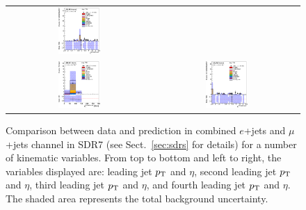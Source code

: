 \begin{figure}[htbp]
\begin{center}
\begin{tabular}{cc}
\includegraphics[width=0.30\textwidth]{appendices/figures/sdrs/JetEta3_ELEMUONCR7_1W_NOMINAL.eps} \\
\includegraphics[width=0.30\textwidth]{appendices/figures/sdrs/JetPt4_ELEMUONCR7_1W_NOMINAL.eps}  &
\includegraphics[width=0.30\textwidth]{appendices/figures/sdrs/JetEta4_ELEMUONCR7_1W_NOMINAL.eps}  \\
\end{tabular}\caption{\small {Comparison between data and prediction in combined $e$+jets and $\mu$+jets channel in SDR7 (see Sect.~\ref{sec:sdrs} for details) 
for a number of kinematic variables. From top to bottom and left to right, the variables displayed are: leading jet $\pt$ and $\eta$,  second leading jet $\pt$ and $\eta$,
third leading jet $\pt$ and $\eta$, and fourth leading jet $\pt$ and $\eta$. The shaded area represents the total background uncertainty.}}
\label{fig:ELEMUONCR7_2}
\end{center}
\end{figure}                                                                             

